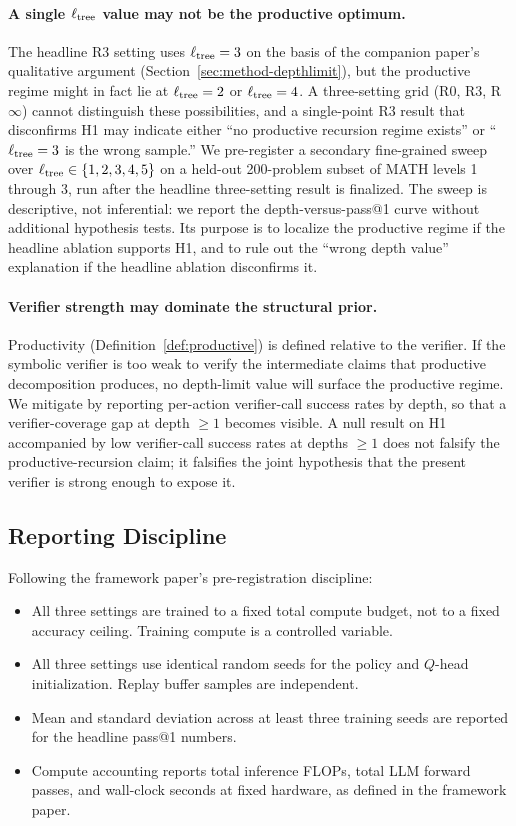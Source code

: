 \paragraph{A single $\ell_{\mathrm{tree}}$ value may not be the productive optimum.}
The headline R3 setting uses $\ell_{\mathrm{tree}} = 3$ on the basis of the
companion paper's qualitative argument
(Section~\ref{sec:method-depthlimit}), but the productive regime
might in fact lie at $\ell_{\mathrm{tree}} = 2$ or $\ell_{\mathrm{tree}} = 4$. A
three-setting grid (R0, R3, R$\infty$) cannot distinguish these
possibilities, and a single-point R3 result that disconfirms H1 may
indicate either ``no productive recursion regime exists'' or
``$\ell_{\mathrm{tree}} = 3$ is the wrong sample.'' We pre-register a secondary
fine-grained sweep over $\ell_{\mathrm{tree}} \in \{1, 2, 3, 4, 5\}$ on a
held-out 200-problem subset of MATH levels 1 through 3, run after the
headline three-setting result is finalized. The sweep is descriptive,
not inferential: we report the depth-versus-pass@1 curve without
additional hypothesis tests. Its purpose is to localize the
productive regime if the headline ablation supports H1, and to rule
out the ``wrong depth value'' explanation if the headline ablation
disconfirms it.

\paragraph{Verifier strength may dominate the structural prior.}
Productivity (Definition~\ref{def:productive}) is defined relative to
the verifier. If the symbolic verifier is too weak to verify the
intermediate claims that productive decomposition produces, no
depth-limit value will surface the productive regime. We mitigate by
reporting per-action verifier-call success rates by depth, so that a
verifier-coverage gap at depth $\geq 1$ becomes visible. A null
result on H1 accompanied by low verifier-call success rates at
depths $\geq 1$ does not falsify the productive-recursion claim; it
falsifies the joint hypothesis that the present verifier is strong
enough to expose it.

\subsection{Reporting Discipline}
\label{sec:exp-reporting}

Following the framework paper's pre-registration discipline:
\begin{itemize}[leftmargin=*]
  \item All three settings are trained to a fixed total compute budget,
        not to a fixed accuracy ceiling. Training compute is a
        controlled variable.
  \item All three settings use identical random seeds for the policy
        and $Q$-head initialization. Replay buffer samples are
        independent.
  \item Mean and standard deviation across at least three training
        seeds are reported for the headline pass@1 numbers.
  \item Compute accounting reports total inference FLOPs, total LLM
        forward passes, and wall-clock seconds at fixed hardware, as
        defined in the framework paper.
\end{itemize}

